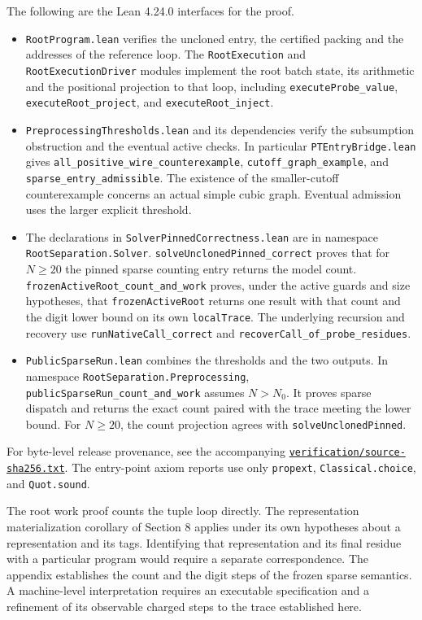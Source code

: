 \documentclass[
  11pt,
]{article}
\begin{document}
The following are the Lean 4.24.0 interfaces for the proof.
\begin{itemize}
\item \nolinkurl{RootProgram.lean} verifies the uncloned entry,
the certified packing and the addresses of the reference loop.
The \texttt{RootExecution} and \texttt{RootExecutionDriver}
modules implement the root batch state, its arithmetic and
the positional projection to that loop, including
\nolinkurl{executeProbe_value}, \nolinkurl{executeRoot_project},
and \nolinkurl{executeRoot_inject}.
\item \nolinkurl{PreprocessingThresholds.lean} and its dependencies
verify the subsumption obstruction and the eventual active
checks. In particular \nolinkurl{PTEntryBridge.lean} gives
\nolinkurl{all_positive_wire_counterexample},
\nolinkurl{cutoff_graph_example}, and
\nolinkurl{sparse_entry_admissible}. The existence of the
smaller-cutoff counterexample concerns an actual simple
cubic graph. Eventual admission uses the larger explicit
threshold.
\item The declarations in \nolinkurl{SolverPinnedCorrectness.lean}
are in namespace \texttt{RootSeparation.Solver}.
\nolinkurl{solveUnclonedPinned_correct} proves that for
\(N\ge20\) the pinned sparse counting entry returns the model
count. \nolinkurl{frozenActiveRoot_count_and_work} proves,
under the active guards and size hypotheses, that
\texttt{frozenActiveRoot} returns one result with that count
and the digit lower bound on its own \texttt{localTrace}.
The underlying recursion and recovery use
\nolinkurl{runNativeCall_correct} and
\nolinkurl{recoverCall_of_probe_residues}.
\item \nolinkurl{PublicSparseRun.lean} combines the thresholds and the
two outputs. In namespace \nolinkurl{RootSeparation.Preprocessing},
\nolinkurl{publicSparseRun_count_and_work} assumes \(N>N_0\).
It proves sparse dispatch and returns the exact count paired with
the trace meeting the lower bound. For \(N\ge20\), the count
projection agrees with \nolinkurl{solveUnclonedPinned}.
\end{itemize}
For byte-level release provenance, see the accompanying
\href{../verification/source-sha256.txt}{\nolinkurl{verification/source-sha256.txt}}.
The entry-point axiom reports use only \texttt{propext},
\texttt{Classical.choice}, and \texttt{Quot.sound}.

The root work proof counts the tuple loop directly. The
representation materialization corollary of Section 8 applies
under its own hypotheses about a representation and its tags.
Identifying that representation and its final residue with a
particular program would require a separate correspondence.
The appendix establishes the count and the digit steps of
the frozen sparse semantics. A machine-level interpretation
requires an executable specification and a refinement of
its observable charged steps to the trace established here.
\end{document}
